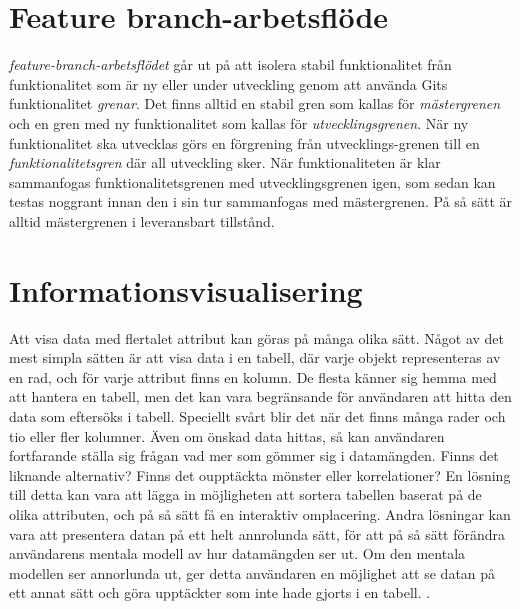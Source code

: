 \section{Feature branch-arbetsflöde}
\label{sec:feature-branch-workflow}
\textit{feature-branch-arbetsflödet} går ut på att isolera stabil funktionalitet från
funktionalitet som är ny eller under utveckling genom att använda Gits funktionalitet
\textit{grenar}.\cite{website:atlassian_git}
Det finns alltid en stabil gren som kallas för \textit{mästergrenen} och en gren med ny
funktionalitet som kallas för \textit{utvecklingsgrenen}. När ny funktionalitet ska utvecklas
görs en förgrening från utvecklings-grenen till en \textit{funktionalitetsgren} där all
utveckling sker. När funktionaliteten är klar sammanfogas funktionalitetsgrenen med
utvecklingsgrenen igen, som sedan kan testas noggrant innan den i sin tur
sammanfogas med mästergrenen. På så sätt är alltid mästergrenen i leveransbart tillstånd.

\section{Informationsvisualisering}
\label{sec:info-vis}
Att visa data med flertalet attribut kan göras på många olika sätt. Något av det mest simpla sätten är att visa data i en tabell, där varje objekt representeras av en rad, och för varje attribut finns en kolumn. 
De flesta känner sig hemma med att hantera en tabell, men det kan vara begränsande för användaren att hitta den data som eftersöks i tabell. Speciellt svårt blir det när det finns många rader och tio eller fler kolumner. 
Även om önskad data hittas, så kan användaren fortfarande ställa sig frågan vad mer som gömmer sig i datamängden. Finns det liknande alternativ? Finns det oupptäckta mönster eller korrelationer?
En lösning till detta kan vara att lägga in möjligheten att sortera tabellen baserat på de olika attributen, och på så sätt få en interaktiv omplacering.
Andra lösningar kan vara att presentera datan på ett helt annrolunda sätt, för att på så sätt förändra användarens mentala modell av hur datamängden ser ut. Om den mentala modellen ser annorlunda ut, ger detta användaren en möjlighet att se datan på ett annat sätt och göra upptäckter som inte hade gjorts i en tabell. \cite{information-visualization}. %

